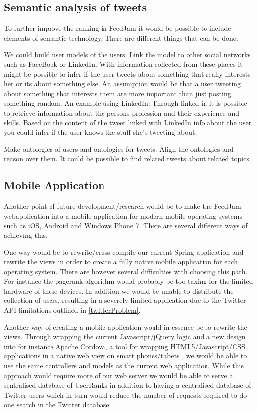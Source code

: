 \subsection{Semantic analysis of tweets} %
\label{semtanticAnalysation}
To further improve the ranking in FeedJam it would be possible to include elements of semantic technology. There are different things that can be done.

We could build user models of the users. Link the model to other social networks such as FaceBook or LinkedIn. With information collected from these places it might be possible to infer if the user tweets about something that really interests her or its about something else. An assumption would be that a user tweeting about something that interests them are more important than just posting something random. An example using LinkedIn: Through linked in it is possible to retrieve information about the persons profession and their experience and skills. Based on the content of the tweet linked with LinkedIn info about the user you could infer if the user knows the stuff she's tweeting about. 

Make ontologies of users and ontologies for tweets. Align the ontologies and reason over them. It could be possible to find related tweets about related topics. 



\subsection{Mobile Application}
Another point of future development/research would be to make the FeedJam webapplication into a mobile application for modern mobile operating systems such as iOS, Android and Windows Phone 7. There are several different ways of achieving this. 

One way would be to rewrite/cross-compile our current Spring application and rewrite the views in order to create a fully native mobile application for each operating system. There are however several difficulties with choosing this path. For instance the pagerank algorithm would probably be too taxing for the limited hardware of these devices. In addition we would be unable to distribute the collection of users, resulting in a severely limited application due to the Twitter API limitations outlined in \ref{twitterProblem}.

Another way of creating a mobile application would in essence be to rewrite the views. Through wrapping the current Javascript/jQuery logic and a new design into for instance Apache Cordova, a tool for wrapping HTML5/Javascript/CSS applications in a native web view on smart phones/tabets \cite{ApacheCordova}, we would be able to use the same controllers and models as the current web application. While this approach would require more of our web server we would be able to serve a sentralised database of UserRanks in addition to having a centralised database of Twitter users which in turn would reduce the number of requests required to do one search in the Twitter database.

